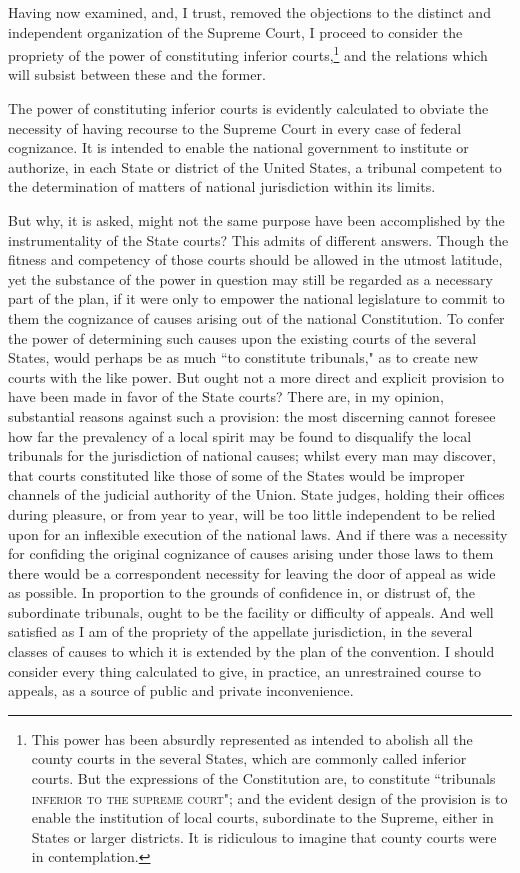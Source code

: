 Having now examined, and, I trust, removed the objections to the distinct and independent organization of the Supreme Court, I proceed to consider the propriety of the power of constituting inferior courts,\footnote{This power has been absurdly represented as intended to abolish all the county courts in the several States, which are commonly called inferior courts. But the expressions of the Constitution are, to constitute ``tribunals \textsc{inferior to the supreme court}"; and the evident design of the provision is to enable the institution of local courts, subordinate to the Supreme, either in States or larger districts. It is ridiculous to imagine that county courts were in contemplation.} and the relations which will subsist between these and the former.

The power of constituting inferior courts is evidently calculated to obviate the necessity of having recourse to the Supreme Court in every case of federal cognizance. It is intended to enable the national government to institute or authorize, in each State or district of the United States, a tribunal competent to the determination of matters of national jurisdiction within its limits.

But why, it is asked, might not the same purpose have been accomplished by the instrumentality of the State courts? This admits of different answers. Though the fitness and competency of those courts should be allowed in the utmost latitude, yet the substance of the power in question may still be regarded as a necessary part of the plan, if it were only to empower the national legislature to commit to them the cognizance of causes arising out of the national Constitution. To confer the power of determining such causes upon the existing courts of the several States, would perhaps be as much ``to constitute tribunals," as to create new courts with the like power. But ought not a more direct and explicit provision to have been made in favor of the State courts? There are, in my opinion, substantial reasons against such a provision: the most discerning cannot foresee how far the prevalency of a local spirit may be found to disqualify the local tribunals for the jurisdiction of national causes; whilst every man may discover, that courts constituted like those of some of the States would be improper channels of the judicial authority of the Union. State judges, holding their offices during pleasure, or from year to year, will be too little independent to be relied upon for an inflexible execution of the national laws. And if there was a necessity for confiding the original cognizance of causes arising under those laws to them there would be a correspondent necessity for leaving the door of appeal as wide as possible. In proportion to the grounds of confidence in, or distrust of, the subordinate tribunals, ought to be the facility or difficulty of appeals. And well satisfied as I am of the propriety of the appellate jurisdiction, in the several classes of causes to which it is extended by the plan of the convention. I should consider every thing calculated to give, in practice, an unrestrained course to appeals, as a source of public and private inconvenience.

